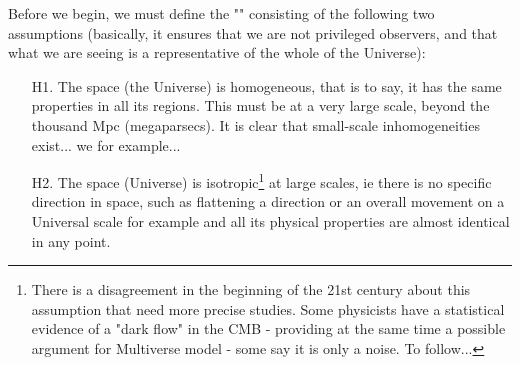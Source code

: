 	Before we begin, we must define the "" consisting of the following two assumptions (basically, it ensures that we are not privileged observers, and that what we are seeing is a representative of the whole of the Universe):
	
	\begin{itemize}
		\item[H1.] The space (the Universe) is homogeneous, that is to say, it has the same properties in all its regions. This must be at a very large scale, beyond the thousand Mpc (megaparsecs). It is clear that small-scale inhomogeneities exist... we for example... \Winkey
		
		\item[H2.] The space (Universe) is isotropic\footnote{There is a disagreement in the beginning of the 21st century about this assumption that need more precise studies. Some physicists have a statistical evidence of a "dark flow" in the CMB - providing at the same time a possible argument for Multiverse model - some say it is only a noise. To follow...} at large scales, ie there is no specific direction in space, such as flattening a direction or an overall movement on a Universal scale for example and all its physical properties are almost identical in any point.
	\end{itemize}
	
